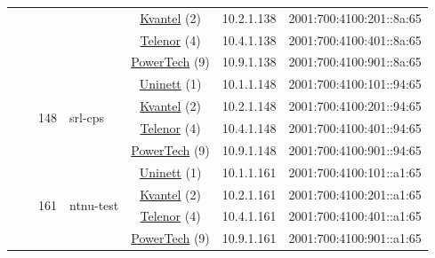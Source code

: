 \begin{small}
\begin{center}
\begin{longtable}{|c|c|c|c|c|c|c|c|}
  &  &  &  & \multicolumn{2}{|c|}{\tiny{\href{http://kvantel.no}{Kvantel} (2)}} & \tiny{10.2.1.138} & \tiny{2001:700:4100:201::8a:65} \\* \cline{5-5}\cline{6-6}\cline{7-7}\cline{8-8}
  &  &  &  & \multicolumn{2}{|c|}{\tiny{\href{https://www.telenor.no}{Telenor} (4)}} & \tiny{10.4.1.138} & \tiny{2001:700:4100:401::8a:65} \\* \cline{5-5}\cline{6-6}\cline{7-7}\cline{8-8}
  &  &  &  & \multicolumn{2}{|c|}{\tiny{\href{http://www.powertech.no}{PowerTech} (9)}} & \tiny{10.9.1.138} & \tiny{2001:700:4100:901::8a:65} \\* \cline{3-3}\cline{4-4}\cline{5-5}\cline{6-6}\cline{7-7}\cline{8-8}
  &  & \multirow{4}{*}{\tiny{148}} & \multicolumn{1}{|l|}{\multirow{4}{*}{\tiny{srl-cps}}} & \multicolumn{2}{|c|}{\tiny{\href{https://www.uninett.no}{Uninett} (1)}} & \tiny{10.1.1.148} & \tiny{2001:700:4100:101::94:65} \\* \cline{5-5}\cline{6-6}\cline{7-7}\cline{8-8}
  &  &  &  & \multicolumn{2}{|c|}{\tiny{\href{http://kvantel.no}{Kvantel} (2)}} & \tiny{10.2.1.148} & \tiny{2001:700:4100:201::94:65} \\* \cline{5-5}\cline{6-6}\cline{7-7}\cline{8-8}
  &  &  &  & \multicolumn{2}{|c|}{\tiny{\href{https://www.telenor.no}{Telenor} (4)}} & \tiny{10.4.1.148} & \tiny{2001:700:4100:401::94:65} \\* \cline{5-5}\cline{6-6}\cline{7-7}\cline{8-8}
  &  &  &  & \multicolumn{2}{|c|}{\tiny{\href{http://www.powertech.no}{PowerTech} (9)}} & \tiny{10.9.1.148} & \tiny{2001:700:4100:901::94:65} \\* \cline{3-3}\cline{4-4}\cline{5-5}\cline{6-6}\cline{7-7}\cline{8-8}
  &  & \multirow{4}{*}{\tiny{161}} & \multicolumn{1}{|l|}{\multirow{4}{*}{\tiny{ntnu-test}}} & \multicolumn{2}{|c|}{\tiny{\href{https://www.uninett.no}{Uninett} (1)}} & \tiny{10.1.1.161} & \tiny{2001:700:4100:101::a1:65} \\* \cline{5-5}\cline{6-6}\cline{7-7}\cline{8-8}
  &  &  &  & \multicolumn{2}{|c|}{\tiny{\href{http://kvantel.no}{Kvantel} (2)}} & \tiny{10.2.1.161} & \tiny{2001:700:4100:201::a1:65} \\* \cline{5-5}\cline{6-6}\cline{7-7}\cline{8-8}
  &  &  &  & \multicolumn{2}{|c|}{\tiny{\href{https://www.telenor.no}{Telenor} (4)}} & \tiny{10.4.1.161} & \tiny{2001:700:4100:401::a1:65} \\* \cline{5-5}\cline{6-6}\cline{7-7}\cline{8-8}
  &  &  &  & \multicolumn{2}{|c|}{\tiny{\href{http://www.powertech.no}{PowerTech} (9)}} & \tiny{10.9.1.161} & \tiny{2001:700:4100:901::a1:65} \\* \cline{3-3}\cline{4-4}\cline{5-5}\cline{6-6}\cline{7-7}\cline{8-8}

\end{longtable}
\end{center}
\end{small}
